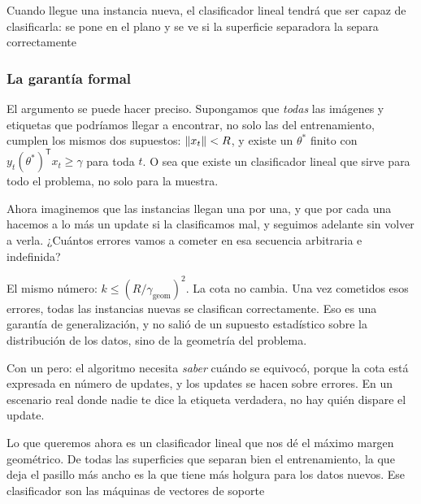 \documentclass[11pt,letterpaper]{article}
\begin{document}
Cuando llegue una instancia nueva, el clasificador lineal tendrá que
ser capaz de clasificarla: se pone en el plano y se ve si la
superficie separadora la separa correctamente


\subsubsection*{La garantía formal}

El argumento se puede hacer preciso. Supongamos que \emph{todas} las
imágenes y etiquetas que podríamos llegar a encontrar, no solo las del
entrenamiento, cumplen los mismos dos supuestos: $\left\lVert x_t \right\rVert < R$, y
existe un $\theta^{*}$ finito con
$y_t (\theta^{*})^{\mathsf{T}} x_t \geq \gamma$ para toda $t$. O sea
que existe un clasificador lineal que sirve para todo el problema, no
solo para la muestra.

Ahora imaginemos que las instancias llegan una por una, y que por cada
una hacemos a lo más un update si la clasificamos mal, y seguimos
adelante sin volver a verla. ¿Cuántos errores vamos a cometer en esa
secuencia arbitraria e indefinida?

\begin{idea}
  El mismo número: $k \leq (R / \gamma_{\mathrm{geom}})^{2}$. La cota
  no cambia. Una vez cometidos esos errores, todas las instancias
  nuevas se clasifican correctamente. Eso es una garantía de
  generalización, y no salió de un supuesto estadístico sobre la
  distribución de los datos, sino de la geometría del problema.
\end{idea}

\begin{ojo}
  Con un pero: el algoritmo necesita \emph{saber} cuándo se equivocó,
  porque la cota está expresada en número de updates, y los updates se
  hacen sobre errores. En un escenario real donde nadie te dice la
  etiqueta verdadera, no hay quién dispare el update.
\end{ojo}

\begin{idea}
  Lo que queremos ahora es un clasificador lineal que nos dé el
  máximo margen geométrico. De todas las superficies que separan bien
  el entrenamiento, la que deja el pasillo más ancho es la que tiene
  más holgura para los datos nuevos. Ese clasificador son las
  máquinas de vectores de soporte
\end{idea}

\newpage

\end{document}
